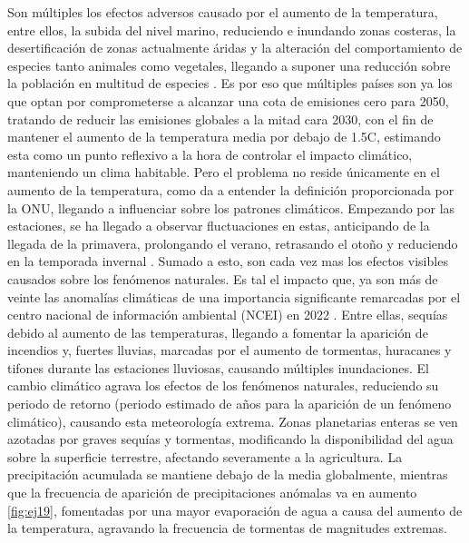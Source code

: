 Son múltiples los efectos adversos causado por el aumento de la temperatura, entre ellos, la subida del nivel marino, reduciendo e inundando zonas costeras, la desertificación de zonas actualmente áridas y la alteración del comportamiento de especies tanto animales como vegetales, llegando a suponer una reducción sobre la población en multitud de especies \cite{arnell2019global} \cite{new2011four}. Es por eso que múltiples países son ya los que optan por comprometerse a alcanzar una cota de emisiones cero para 2050, tratando de reducir las emisiones globales a la mitad cara 2030, con el fin de mantener el aumento de la temperatura media por debajo de 1.5\textdegree C, estimando esta como un punto reflexivo a la hora de controlar el impacto climático, manteniendo un clima habitable.\newline
\newline
Pero el problema no reside únicamente en el aumento de la temperatura, como da a entender la definición proporcionada por la ONU, llegando a influenciar sobre los patrones climáticos. Empezando por las estaciones, se ha llegado a observar fluctuaciones en estas, anticipando de la llegada de la primavera, prolongando el verano, retrasando el otoño y reduciendo en la temporada invernal \cite{sparks2002observed}.\newline
\newline
Sumado a esto, son cada vez mas los efectos visibles causados sobre los fenómenos naturales. Es tal el impacto que, ya son más de veinte las anomalías climáticas de una importancia significante remarcadas por el centro nacional de información ambiental (NCEI) en 2022 \cite{NCEIWeb}. Entre ellas, sequías debido al aumento de las temperaturas, llegando a fomentar la aparición de incendios y, fuertes lluvias, marcadas por el aumento de tormentas, huracanes y tifones durante las estaciones lluviosas, causando múltiples inundaciones.\newline
\newline
El cambio climático agrava los efectos de los fenómenos naturales, reduciendo su periodo de retorno (periodo estimado de años para la aparición de un fenómeno climático), causando esta meteorología extrema. Zonas planetarias enteras se ven azotadas por graves sequías y tormentas, modificando la disponibilidad del agua sobre la superficie terrestre, afectando severamente a la agricultura. La precipitación acumulada se mantiene debajo de la media globalmente, mientras que la frecuencia de aparición de precipitaciones anómalas va en aumento \ref{fig:ej19}, fomentadas por una mayor evaporación de agua a causa del aumento de la temperatura, agravando la frecuencia de tormentas de magnitudes extremas. 

